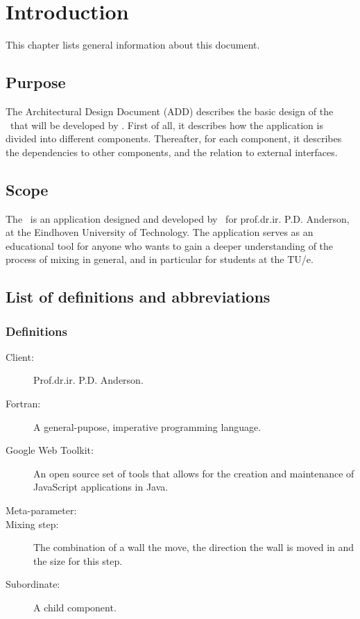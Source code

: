 \chapter{Introduction}

This chapter lists general information about this document.

\section{Purpose}
The Architectural Design Document (ADD) describes the basic design of the \applicationname\ that will be developed by \projectauthor. First of all, it describes how the application is divided into different components. Thereafter, for each component, it describes the dependencies to other components, and the relation to external interfaces.

\section{Scope}
The \applicationname\ is an application designed and developed by \projectauthor\ for prof.dr.ir. P.D. Anderson, at the Eindhoven University of Technology. The application serves as an educational tool for anyone who wants to gain a deeper understanding of the process of mixing in general, and in particular for students at the TU/e.

\section{List of definitions and abbreviations}
\subsection{Definitions}
\begin{description}
\item[Client:] Prof.dr.ir. P.D. Anderson.
\item[Fortran:] A general-pupose, imperative programming language.
\item[Google Web Toolkit:] An open source set of tools that allows for the creation and maintenance of JavaScript applications in Java.
\item[Meta-parameter:] 
\item[Mixing step:] The combination of a wall the move, the direction the wall is moved in and the size for this step.
\item[Subordinate:] A child component.
\end{description}


